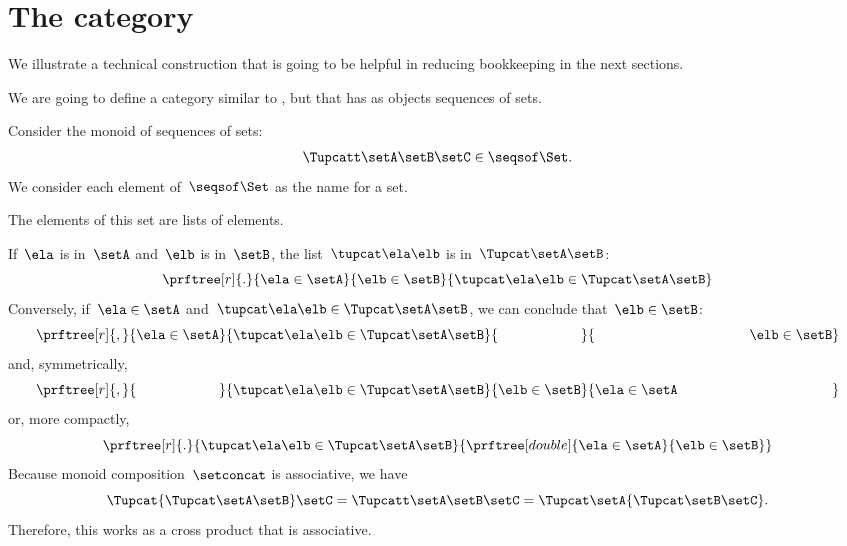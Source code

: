 \section{The \SetStar category}
\label{sec:SetStar}

We illustrate a technical construction that is going to be helpful in reducing bookkeeping in the next sections.

We are going to define a category similar to \Set, but that has as objects sequences of sets.

Consider the monoid of sequences of sets:
%
\begin{equation}
    \label{eq:sets-monoid}
    \Tupcatt \setA  \setB  \setC \in \seqsof\Set.
\end{equation}
%
We consider each element of~$\seqsof\Set$ as the name for a set.

The elements of this set are lists of elements.

If~$\ela$ is in~$\setA$ and~$\elb$ is in~$\setB$, the list~$\tupcat \ela \elb$ is in~$\Tupcat \setA \setB$:
%
\begin{equation}
    \label{eq:sets-monoid-axiom1}
    \prftree[r]{.}{
        \ela \in \setA
    }{
        \elb \in \setB
    }{ 
        \tupcat \ela \elb \in \Tupcat \setA \setB 
    }
\end{equation}
%
Conversely, if~$\ela \in \setA$ and~$\tupcat \ela \elb \in \Tupcat \setA \setB$, we can conclude that~$\elb \in \setB$:
%
\begin{equation}
    \label{eq:sets-monoid-axiom2}
    \prftree[r]{,}{
        \ela \in \setA
    }{ 
        \tupcat \ela \elb \in \Tupcat \setA  \setB
    }{
        \phantom{\elb \in \setB}
    }{  
        \rule{39mm}{0pt} \elb \in  \setB 
    }
\end{equation}
% 
and, symmetrically, 
% 
\begin{equation}
    \label{eq:sets-monoid-axiom3}
    \prftree[r]{,}{
        \phantom{\ela \in \setA}
    }{
        \tupcat \ela \elb \in \Tupcat \setA \setB  
    }{
        \elb \in \setB
    }{  
        \ela \in  \setA \rule{39mm}{0pt}
    }
\end{equation}
%
or, more compactly,
% 
\begin{equation}
    \label{eq:sets-monoid-axiom3bis}
    \prftree[r]{.}{
        \tupcat \ela \elb \in \Tupcat \setA \setB  
    }{
        \prftree[double]{
            \ela \in \setA
        }{
            \elb \in \setB
        }
    }
\end{equation}
% 
Because monoid composition~$\setconcat$ is associative, we have
%
\begin{equation}
    \label{eq:sets-monoid-comp}
    \Tupcat {\Tupcat \setA  \setB}  \setC  =
    \Tupcatt \setA    \setB \setC  =
    \Tupcat   \setA  {\Tupcat \setB  \setC}.
\end{equation}
%
Therefore, this works as a cross product that is associative.

